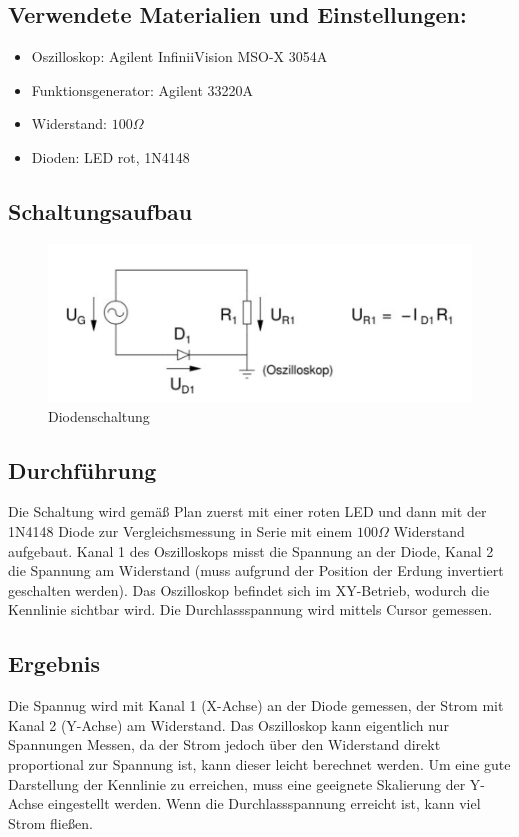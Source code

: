 \documentclass[12pt,a4paper,titlepage]{article}
\begin{document}
\subsection{Verwendete Materialien und Einstellungen:}
\begin{itemize}
  \item Oszilloskop: Agilent InfiniiVision MSO-X 3054A
  \item Funktionsgenerator: Agilent 33220A
  \item Widerstand: $100\Omega$
  \item Dioden: LED rot, 1N4148
\end{itemize}

\subsection{Schaltungsaufbau}
\begin{figure}[H]
  \centering
  \includegraphics[width=150mm]{diodenschaltung.png}
  \caption{Diodenschaltung}
  \label{Figure8.3.1}
\end{figure}

\subsection{Durchführung}
Die Schaltung wird gemäß Plan zuerst mit einer roten LED und dann mit der 1N4148 Diode zur Vergleichsmessung in Serie mit einem $100\Omega$ Widerstand aufgebaut. Kanal 1 des Oszilloskops misst die Spannung an der Diode, Kanal 2 die Spannung am Widerstand (muss aufgrund der Position der Erdung invertiert geschalten werden). Das Oszilloskop befindet sich im XY-Betrieb, wodurch die Kennlinie sichtbar wird. Die Durchlassspannung wird mittels Cursor gemessen.

\subsection{Ergebnis}
Die Spannug wird mit Kanal 1 (X-Achse) an der Diode gemessen, der Strom mit Kanal 2 (Y-Achse) am Widerstand. Das Oszilloskop kann eigentlich nur Spannungen Messen, da der Strom jedoch über den Widerstand direkt proportional zur Spannung ist, kann dieser leicht berechnet werden. Um eine gute Darstellung der Kennlinie zu erreichen, muss eine geeignete Skalierung der Y-Achse eingestellt werden. Wenn die Durchlassspannung erreicht ist, kann viel Strom fließen.
\end{document}
